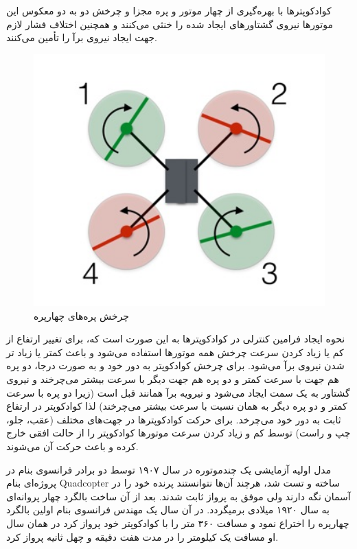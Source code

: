 کوادکوپترها با بهره‌گیری از چهار موتور و پره مجزا و چرخش دو به دو معکوس این موتورها نیروی گشتاورهای ایجاد شده را خنثی می‌کنند و همچنین اختلاف فشار لازم جهت ایجاد نیروی برآ را تأمین می‌کنند.

\begin{figure}[H]
	\includegraphics[width=12cm]{figs/introduction/Quadblade.jpg}
	\centering
	\caption{چرخش پره‌های چهارپره}
\end{figure}
نحوه ایجاد فرامین کنترلی در کوادکوپترها به این صورت است که، برای تغییر ارتفاع از کم یا زیاد کردن سرعت چرخش همه موتورها استفاده می‌شود و باعث کمتر یا زیاد تر شدن نیروی برآ می‌شود. برای چرخش کوادکوپتر به دور خود و به صورت درجا، دو پره هم جهت با سرعت کمتر و دو پره هم جهت دیگر با سرعت بیشتر می‌چرخند و نیروی گشتاور به یک سمت ایجاد می‌شود و نیرویه برآ همانند قبل است (زیرا دو پره با سرعت کمتر و دو پره دیگر به همان نسبت با سرعت بیشتر می‌چرخند) لذا کوادکوپتر در ارتفاع ثابت به دور خود می‌چرخد. برای حرکت کوادکوپترها در جهت‌های مختلف (عقب، جلو، چپ و راست) توسط کم و زیاد کردن سرعت موتورها کوادکوپتر را از حالت افقی خارج کرده و باعث حرکت آن می‌شوند.

مدل‬ اولیه آزمایشی یک چندموتوره در سال ۱۹۰۷ توسط دو برادر فرانسوی بنام  در پروژه‌ای بنام Quadcopter ساخته و تست شد، هرچند آن‌ها نتوانستند پرنده خود را در آسمان نگه دارند ولی موفق به پرواز ثابت شدند. بعد از آن ساخت بالگرد چهار پروانه‌ای به سال ۱۹۲۰ میلادی برمیگردد. در آن سال یک مهندس فرانسوی بنام  اولین بالگرد چهارپره را اختراع نمود و مسافت ۳۶۰ متر را با کوادکوپتر خود پرواز کرد در همان سال او مسافت یک کیلومتر را در مدت هفت دقیقه و چهل ثانیه پرواز کرد.

